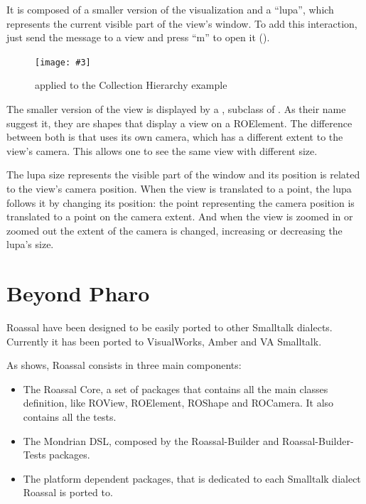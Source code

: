 \documentclass[a4paper,10pt,twoside]{book}
\newcommand{\fig}[4]{
		\begin{figure}[#1]
			\centering
			\texttt{[image: \#3]}
			\caption{\label{fig:#3}#4}
		\end{figure}}
\begin{document}
It is composed of a smaller version of the visualization and a ``lupa'', which represents the current visible part of the view's window. To add this interaction, just send the  message to a view and press ``m'' to open it (). 

\fig{H}{0.9}{miniMap}{ applied to the Collection Hierarchy example}

The smaller version of the view is displayed by a , subclass of . 
As their name suggest it, they are shapes that display a view on a ROElement. The difference between both is that  uses its own camera, which has a different extent to the view's camera. This allows one to see the same view with different size. 

The lupa  size represents the visible part of the window and its position is related to the view's camera position. When the view is translated to a point, the lupa follows it by changing its position: the point representing the camera position is translated to a point on the  camera extent. And when the view is zoomed in or zoomed out the extent of the camera is changed, increasing or decreasing the lupa's size.




\section{Beyond Pharo}

Roassal have been designed to be easily ported to other Smalltalk dialects. Currently it has been ported to VisualWorks, Amber and VA Smalltalk.

As  shows, Roassal consists in three main components:

\begin{itemize}
\item  The Roassal Core, a set of packages that contains all the main classes definition, like ROView, ROElement, ROShape and ROCamera. It also contains all the tests.
\item The Mondrian DSL, composed by the Roassal-Builder and Roassal-Builder-Tests packages.
\item The platform dependent packages, that is dedicated to each Smalltalk dialect Roassal is ported to.
\end{itemize} 
\end{document}
